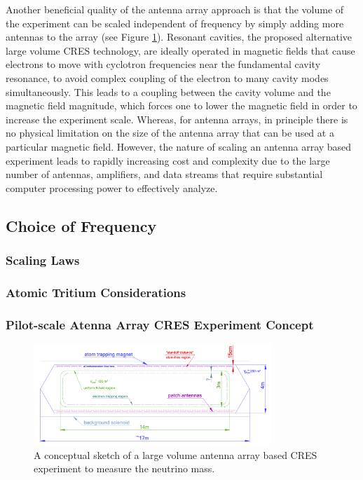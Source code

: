 Another beneficial quality of the antenna array approach is that the volume of the experiment can be scaled independent of frequency by simply adding more antennas to the array (see Figure \ref{fig:chap3-phaseiv-antenna}). Resonant cavities, the proposed alternative large volume CRES technology, are ideally operated in magnetic fields that cause electrons to move with cyclotron frequencies near the fundamental cavity resonance, to avoid complex coupling of the electron to many cavity modes simultaneously. This leads to a coupling between the cavity volume and the magnetic field magnitude, which forces one to lower the magnetic field in order to increase the experiment scale. Whereas, for antenna arrays, in principle there is no physical limitation on the size of the antenna array that can be used at a particular magnetic field. However, the nature of scaling an antenna array based experiment leads to rapidly increasing cost and complexity due to the large number of antennas, amplifiers, and data streams that require substantial computer processing power to effectively analyze.

\subsection{Choice of Frequency}

\subsubsection*{Scaling Laws}

\subsubsection*{Atomic Tritium Considerations}

\subsubsection*{Pilot-scale Atenna Array CRES Experiment Concept}

\begin{figure}[htbp]
    \centering
    \includegraphics*[width=0.8\textwidth]{figs/Chapter-3/phaseiv_concept_sketch_ver2.png}
    \caption{\label{fig:chap3-phaseiv-antenna} A conceptual sketch of a large volume antenna array based CRES experiment to measure the neutrino mass.}
\end{figure}

